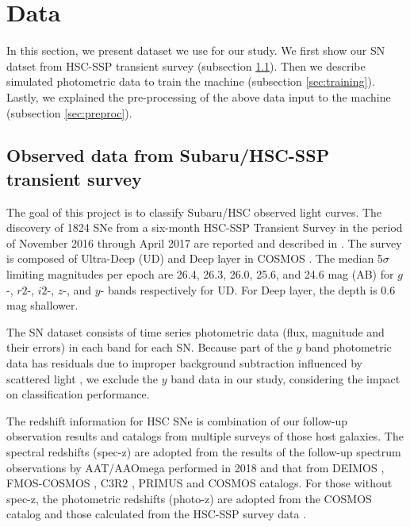 \documentclass[useamsfonts]{pasj01}
\begin{document}
\section{Data}
In this section, we present dataset we use for our study.
We first show our SN datset from HSC-SSP transient survey (subsection \ref{sec:hscdata}).
Then we describe simulated photometric data to train the machine (subsection \ref{sec:training}).
Lastly, we explained the pre-processing of the above data input to the machine (subsection \ref{sec:preproc}).


\subsection{Observed data from Subaru/HSC-SSP transient survey}
\label{sec:hscdata}
The goal of this project is to classify Subaru/HSC observed light curves. 
The discovery of 1824 SNe from a six-month HSC-SSP Transient Survey in the period of
November 2016 through April 2017 are reported and described in \citet{yasuda19a}.
The survey is composed of Ultra-Deep (UD) and Deep layer in COSMOS \citep{scoville07a}.
The median 5$\sigma$ limiting magnitudes per epoch are 26.4, 26.3, 26.0, 25.6, and 24.6 mag (AB)
for $g$-, $r2$-, $i2$-, $z$-, and $y$- bands respectively for UD. 
For Deep layer, the depth is 0.6 mag shallower.

The SN dataset consists of time series photometric data (flux, magnitude and their errors) in each band for each SN.
Because part of the $y$ band photometric data has residuals due to improper background subtraction influenced by scattered light \citep{aihara18dr},
we exclude the $y$ band data in our study, considering the impact on classification performance.

The redshift information for HSC SNe is combination of our follow-up observation results and catalogs from multiple surveys of those host galaxies.
The spectral redshifts (spec-z) are adopted from the results of the follow-up spectrum observations by AAT/AAOmega performed in 2018 and that from DEIMOS \citep{DEIMOS2018}, FMOS-COSMOS \citep{FMOS-COSMOS2015}, C3R2 \citep{C3R2_2017}, PRIMUS \citep{PRIMUS2011} and COSMOS catalogs.
For those without spec-z, the photometric redshifts (photo-z) are adopted from the COSMOS catalog and those calculated from the HSC-SSP survey data \citep{HSCSSP_photo-z2018}.
\end{document}
